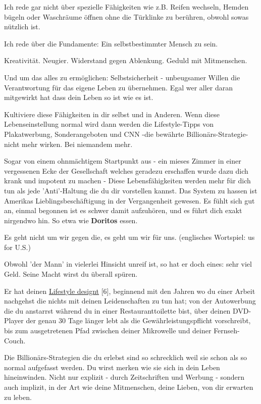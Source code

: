 Ich rede gar nicht über spezielle Fähigkeiten wie z.B. Reifen wechseln, Hemden bügeln oder Waschräume öffnen ohne die Türklinke zu berühren, obwohl sowas nützlich ist.

Ich rede über die Fundamente: Ein selbstbestimmter Mensch zu sein.

Kreativität. Neugier. Widerstand gegen Ablenkung. Geduld mit Mitmenschen.

Und um das alles zu ermöglichen: Selbstsicherheit - unbeugsamer Willen die Verantwortung für das eigene Leben zu übernehmen. Egal wer aller daran mitgewirkt hat dass dein Leben so ist wie es ist.

Kultiviere diese Fähigkeiten in dir selbst und in Anderen. Wenn diese Lebenseinstellung normal wird dann werden die Lifestyle-Tipps von Plakatwerbung, Sonderangeboten und CNN -die bewährte Billionärs-Strategie- nicht mehr wirken. Bei niemandem mehr.

Sogar von einem ohnmächtigem Startpunkt aus - ein mieses Zimmer in einer vergessenen Ecke der Gesellschaft welches geradezu erschaffen wurde dazu dich krank und impotent zu machen - Diese Lebensfähigkeiten werden mehr für dich tun als jede 'Anti'-Haltung die du dir vorstellen kannst. Das System zu hassen ist Amerikas Lieblingsbeschäftigung in der Vergangenheit gewesen. Es fühlt sich gut an, einmal begonnen ist es schwer damit aufzuhören, und es führt dich exakt nirgendwo hin. So etwa wie \textbf{Doritos} essen.

Es geht nicht um wir gegen die, es geht um wir für uns. (englisches Wortspiel: us for U.S.)

Obwohl 'der Mann' in vielerlei Hinsicht unreif ist, so hat er doch eines: sehr viel Geld. Seine Macht wirst du überall spüren. 


Er hat deinen \href{http://www.raptitude.com/2010/07/your-lifestyle-has-already-been-designed/}{Lifestyle designt}  [6], beginnend mit den Jahren wo du einer Arbeit nachgehst die nichts mit deinen Leidenschaften zu tun hat; von der Autowerbung die du anstarrst während du in einer Restauranttoilette bist, über deinen DVD-Player der genau 30 Tage länger lebt als die  Gewährleistungspflicht vorschreibt, bis zum ausgetretenen Pfad zwischen deiner Mikrowelle und deiner Fernseh-Couch.


Die Billionärs-Strategien die du erlebst sind so schrecklich weil sie schon als so normal aufgefasst werden. Du wirst merken wie sie sich in dein Leben hineinwinden. Nicht nur explizit - durch Zeitschriften und Werbung - sondern auch implizit, in der Art wie deine Mitmenschen, deine Lieben, von dir erwarten zu leben.

